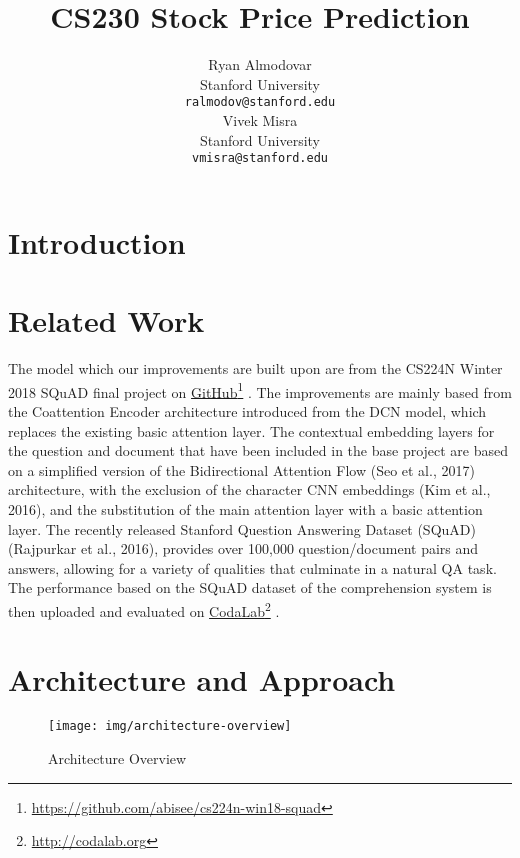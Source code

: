 \documentclass{article} %
\title{CS230 Stock Price Prediction}
\author{
Ryan Almodovar \\
Stanford University\\
\texttt{ralmodov@stanford.edu} \\
\And
Vivek Misra \\
Stanford University \\
\texttt{vmisra@stanford.edu} \\
}
\newcommand\fnurl[2]{%
\href{#2}{#1}\footnote{\url{#2}}%
}
\begin{document}
\maketitle


\section{Introduction}


\section{Related Work}

The model which our improvements are built upon are from the CS224N Winter 2018 SQuAD final project 
on \fnurl{GitHub}{https://github.com/abisee/cs224n-win18-squad}.
The improvements are mainly based from the Coattention Encoder architecture introduced
from the DCN model, which replaces the existing basic attention layer.
The contextual embedding layers for the question and document that have been included in the base project
are based on a simplified version of the Bidirectional Attention Flow (Seo et al., 2017) architecture,
with the exclusion of the character CNN embeddings (Kim et al., 2016),
and the substitution of the main attention layer with a basic attention layer.
The recently released Stanford Question Answering Dataset (SQuAD) (Rajpurkar et al., 2016),
provides over 100,000 question/document pairs and answers, allowing for a variety of qualities that
culminate in a natural QA task.
The performance based on the SQuAD dataset of the comprehension system is then uploaded
and evaluated on \fnurl{CodaLab}{http://codalab.org}.

\pagebreak

\section{Architecture and Approach}
\label{architecture}
\begin{center}%
\begin{figure}[hp!]%
\hspace*{-1cm}%
\texttt{[image: img/architecture-overview]}
\caption{Architecture Overview}
\hspace*{-1cm}%
\end{figure}
\end{center}%
\end{document}
